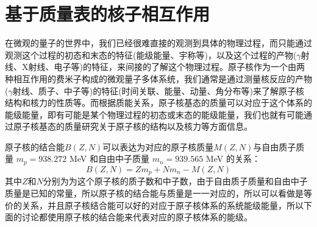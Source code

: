 \chapter{基于质量表的核子相互作用\label{chapmassN}}
在微观的量子的世界中，我们已经很难直接的观测到具体的物理过程，而只能通过观测这个过程的初态和末态的特征(能级能量、宇称等)，以及这个过程的产物($\gamma$射线、X射线、电子等)的特征，来间接的了解这个物理过程。原子核作为一个由两种相互作用的费米子构成的微观量子多体系统，我们通常是通过测量核反应的产物($\gamma$射线、质子、中子等)的特征(时间关联、能量、动量、角分布等)来了解原子核结构和核力的性质等。而根据质能关系，原子核基态的质量可以对应于这个体系的能级能量，即有可能是某个物理过程的初态或末态的能级能量，我们也就有可能通过原子核基态的质量研究关于原子核的结构以及核力等方面信息。

原子核的结合能$B(Z,N)$可以表达为对应的原子核质量$M(Z,N)$与自由质子质量 $m_p=938.272$ MeV 和自由中子质量 $m_n=939.565$ MeV 的关系：
\begin{equation}
B(Z,N)=Zm_p+Nm_n-M(Z,N)
\end{equation}
其中$Z$和$N$分别为为这个原子核的质子数和中子数，由于自由质子质量和自由中子质量是已知的常量，所以原子核的结合能与质量是一一对应的，所以可以看做是等价的关系，并且原子核结合能可以好的对应于原子核体系的系统能级能量，所以下面的讨论都使用原子核的结合能来代表对应的原子核体系的能级。

